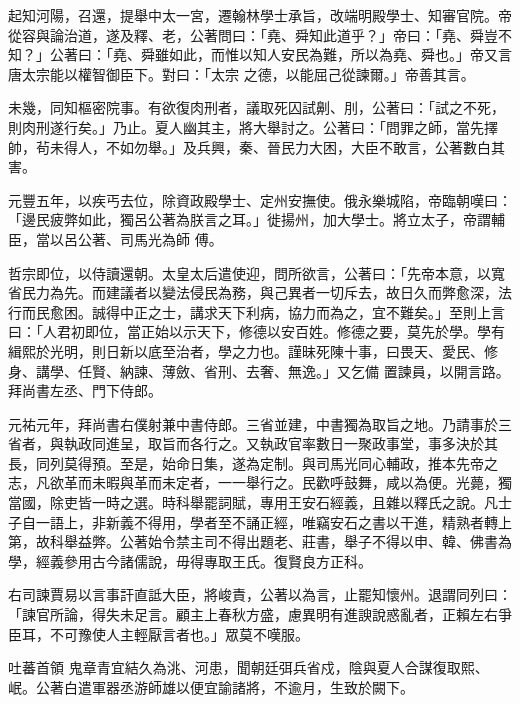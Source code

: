 \begin{pinyinscope}
 起知河陽，召還，提舉中太一宮，遷翰林學士承旨，改端明殿學士、知審官院。帝從容與論治道，遂及釋、老，公著問曰：「堯、舜知此道乎？」帝曰：「堯、舜豈不知？」公著曰：「堯、舜雖如此，而惟以知人安民為難，所以為堯、舜也。」帝又言唐太宗能以權智御臣下。對曰：「太宗
 之德，以能屈己從諫爾。」帝善其言。



 未幾，同知樞密院事。有欲復肉刑者，議取死囚試劓、刖，公著曰：「試之不死，則肉刑遂行矣。」乃止。夏人幽其主，將大舉討之。公著曰：「問罪之師，當先擇帥，茍未得人，不如勿舉。」及兵興，秦、晉民力大困，大臣不敢言，公著數白其害。



 元豐五年，以疾丐去位，除資政殿學士、定州安撫使。俄永樂城陷，帝臨朝嘆曰：「邊民疲弊如此，獨呂公著為朕言之耳。」徙揚州，加大學士。將立太子，帝謂輔臣，當以呂公著、司馬光為師
 傅。



 哲宗即位，以侍讀還朝。太皇太后遣使迎，問所欲言，公著曰：「先帝本意，以寬省民力為先。而建議者以變法侵民為務，與己異者一切斥去，故日久而弊愈深，法行而民愈困。誠得中正之士，講求天下利病，協力而為之，宜不難矣。」至則上言曰：「人君初即位，當正始以示天下，修德以安百姓。修德之要，莫先於學。學有緝熙於光明，則日新以底至治者，學之力也。謹昧死陳十事，曰畏天、愛民、修身、講學、任賢、納諫、薄斂、省刑、去奢、無逸。」又乞備
 置諫員，以開言路。拜尚書左丞、門下侍郎。



 元祐元年，拜尚書右僕射兼中書侍郎。三省並建，中書獨為取旨之地。乃請事於三省者，與執政同進呈，取旨而各行之。又執政官率數日一聚政事堂，事多決於其長，同列莫得預。至是，始命日集，遂為定制。與司馬光同心輔政，推本先帝之志，凡欲革而未暇與革而未定者，一一舉行之。民歡呼鼓舞，咸以為便。光薨，獨當國，除吏皆一時之選。時科舉罷詞賦，專用王安石經義，且雜以釋氏之說。凡士
 子自一語上，非新義不得用，學者至不誦正經，唯竊安石之書以干進，精熟者轉上第，故科舉益弊。公著始令禁主司不得出題老、莊書，舉子不得以申、韓、佛書為學，經義參用古今諸儒說，毋得專取王氏。復賢良方正科。



 右司諫賈易以言事訐直詆大臣，將峻責，公著以為言，止罷知懷州。退謂同列曰：「諫官所論，得失未足言。顧主上春秋方盛，慮異明有進諛說惑亂者，正賴左右爭臣耳，不可豫使人主輕厭言者也。」眾莫不嘆服。



 吐蕃首領
 鬼章青宜結久為洮、河患，聞朝廷弭兵省戍，陰與夏人合謀復取熙、岷。公著白遣軍器丞游師雄以便宜諭諸將，不逾月，生致於闕下。




\end{pinyinscope}
